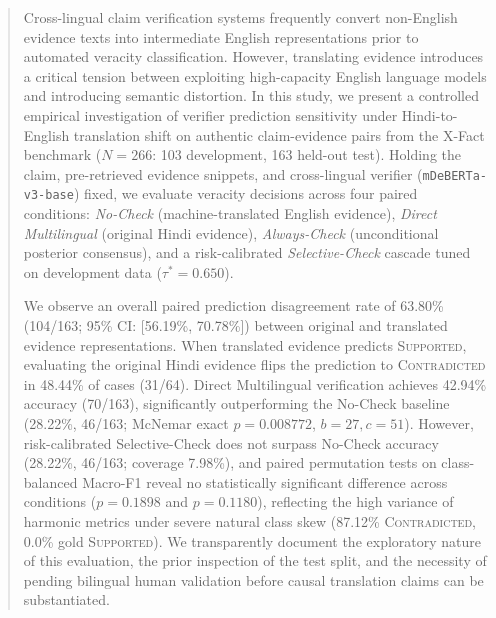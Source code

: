 \begin{abstract}
Cross-lingual claim verification systems frequently convert non-English evidence texts into intermediate English representations prior to automated veracity classification. However, translating evidence introduces a critical tension between exploiting high-capacity English language models and introducing semantic distortion. In this study, we present a controlled empirical investigation of verifier prediction sensitivity under Hindi-to-English translation shift on authentic claim-evidence pairs from the X-Fact benchmark ($N=266$: 103 development, 163 held-out test). Holding the claim, pre-retrieved evidence snippets, and cross-lingual verifier (\texttt{mDeBERTa-v3-base}) fixed, we evaluate veracity decisions across four paired conditions: \emph{No-Check} (machine-translated English evidence), \emph{Direct Multilingual} (original Hindi evidence), \emph{Always-Check} (unconditional posterior consensus), and a risk-calibrated \emph{Selective-Check} cascade tuned on development data ($\tau^*=0.650$).

We observe an overall paired prediction disagreement rate of 63.80\% (104/163; 95\% CI: [56.19\%, 70.78\%]) between original and translated evidence representations. When translated evidence predicts \textsc{Supported}, evaluating the original Hindi evidence flips the prediction to \textsc{Contradicted} in 48.44\% of cases (31/64). Direct Multilingual verification achieves 42.94\% accuracy (70/163), significantly outperforming the No-Check baseline (28.22\%, 46/163; McNemar exact $p = 0.008772$, $b=27, c=51$). However, risk-calibrated Selective-Check does not surpass No-Check accuracy (28.22\%, 46/163; coverage 7.98\%), and paired permutation tests on class-balanced Macro-F1 reveal no statistically significant difference across conditions ($p = 0.1898$ and $p = 0.1180$), reflecting the high variance of harmonic metrics under severe natural class skew (87.12\% \textsc{Contradicted}, 0.0\% gold \textsc{Supported}). We transparently document the exploratory nature of this evaluation, the prior inspection of the test split, and the necessity of pending bilingual human validation before causal translation claims can be substantiated.
\end{abstract}
